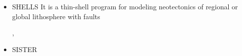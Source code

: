 \begin{itemize}
\begin{scriptsize}
\begin{itemize}
                             \textcite{knva08},  \textcite{vava08}
\item[\twothousandnine]      \textcite{vavl09},  \textcite{vavv09}
\item[\twothousandten]       \textcite{vahy10},  \textcite{syva10},  \textcite{devv10}, 
                             \textcite{vady10},  \textcite{vayb10}
\item[\twothousandeleven]    \textcite{vahs11},  \textcite{java11},  \textcite{vayj11}
\item[\twothousandtwelve]    \textcite{beva12},  
                             \textcite{chgv12}, \textcite{vakn12}
\item[\twothousandthirteen]  \textcite{ancv13},  \textcite{cibi13},  \textcite{bova13}
\item[\twothousandfourteen]  \textcite{chsg14},  \textcite{mova14},  \textcite{chsv14}
\item[\twothousandfifteen]   \textcite{vasy15},  \textcite{cibi15},  \textcite{mori15}
\item[\twothousandseventeen] \textcite{civj17},  \textcite{wewv17}
\item[\twothousandeighteen]  \textcite{spcv18},  \textcite{chss18}
\item[\twothousandnineteen]  \textcite{zhdv19},  \textcite{vayu19},  \textcite{casv19}, 
                             \textcite{vaws19},  \textcite{cibi19}
\item[\twothousandtwenty]    \textcite{moku20}
\item[\twothousandtwentyone] \textcite{pocv21},  \textcite{mota21}
\end{itemize}
\end{scriptsize}

\item {\codefont SHELLS} 
It is a thin-shell program for modeling neotectonics of
regional or global lithosphere with faults

\begin{scriptsize}
\textcite{kobi95}, \textcite{nebs02}
\end{scriptsize}

\item {\codefont SISTER} 


\end{itemize}
